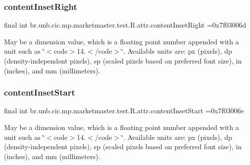 \subsubsection{\texorpdfstring{content\+Inset\+Right}{contentInsetRight}}
{\footnotesize\ttfamily final int br.\+unb.\+cic.\+mp.\+marketmaster.\+test.\+R.\+attr.\+content\+Inset\+Right =0x7f03006d\hspace{0.3cm}{\ttfamily [static]}}

May be a dimension value, which is a floating point number appended with a unit such as \char`\"{}$<$code$>$14.\+5sp$<$/code$>$\char`\"{}. Available units are\+: px (pixels), dp (density-\/independent pixels), sp (scaled pixels based on preferred font size), in (inches), and mm (millimeters). \mbox{\label{classbr_1_1unb_1_1cic_1_1mp_1_1marketmaster_1_1test_1_1R_1_1attr_af4e9a4af4b13bd41ea3386aee8b12d34}} 
\subsubsection{\texorpdfstring{content\+Inset\+Start}{contentInsetStart}}
{\footnotesize\ttfamily final int br.\+unb.\+cic.\+mp.\+marketmaster.\+test.\+R.\+attr.\+content\+Inset\+Start =0x7f03006e\hspace{0.3cm}{\ttfamily [static]}}

May be a dimension value, which is a floating point number appended with a unit such as \char`\"{}$<$code$>$14.\+5sp$<$/code$>$\char`\"{}. Available units are\+: px (pixels), dp (density-\/independent pixels), sp (scaled pixels based on preferred font size), in (inches), and mm (millimeters). \mbox{\label{classbr_1_1unb_1_1cic_1_1mp_1_1marketmaster_1_1test_1_1R_1_1attr_a0fd5e8227c6d43b7dadb5c99c9ecbea9}} 
